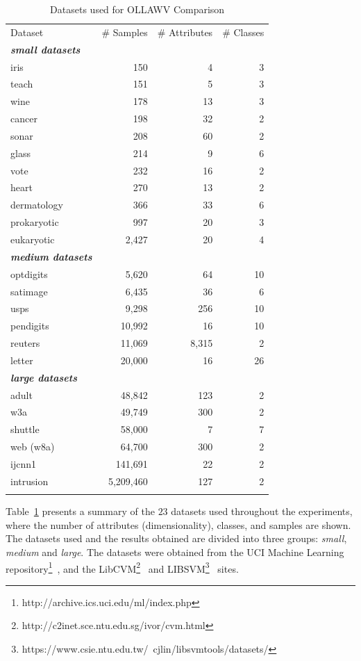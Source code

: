\documentclass[reqno]{vcuthesis}
\numberwithin{equation}{chapter}
\begin{document}
\begin{table}[t!]
\caption{Datasets used for OLLAWV Comparison}
\small
\centering
\label{tab:DatasetOLLAWV}
\begin{tabularx}{0.7\textwidth}{l@{\extracolsep{\fill}}rrr}
\hline\noalign{\smallskip}
Dataset & \# Samples & \# Attributes & \# Classes \\
\noalign{\smallskip}\hline\noalign{\smallskip}
\textbf{\textit{small datasets}} & \\
iris & 150 & 4 &  3  \\ 
teach & 151 & 5 &  3  \\ 
wine & 178 & 13 &  3  \\ 
cancer & 198 & 32 &  2  \\ 
sonar & 208 & 60 &  2  \\ 
glass & 214 & 9 &  6  \\ 
vote & 232 & 16 &  2  \\ 
heart & 270 & 13 &  2  \\ 
dermatology & 366 & 33 &  6  \\ 
prokaryotic & 997 & 20 &  3  \\ 
eukaryotic & 2,427 & 20 &  4  \\ 
\textbf{\textit{medium datasets}} & \\
optdigits & 5,620 & 64 &  10  \\ 
satimage & 6,435 & 36 &  6  \\ 
usps & 9,298 & 256 &  10  \\ 
pendigits & 10,992 & 16 &  10  \\ 
reuters & 11,069 & 8,315 &  2  \\ 
letter & 20,000 & 16 &  26  \\ 
\textbf{\textit{large datasets}} & \\
adult & 48,842 & 123 &  2  \\ 
w3a & 49,749 & 300 &  2  \\ 
shuttle & 58,000 & 7 &  7  \\ 
web (w8a) & 64,700 & 300 &  2  \\ 
ijcnn1 & 141,691 & 22 &  2  \\ 
intrusion & 5,209,460 & 127 &  2  \\  
\noalign{\smallskip}\hline
\end{tabularx}
\end{table}

Table~\ref{tab:DatasetOLLAWV} presents a summary of the $23$ datasets used throughout the experiments, where the number of attributes (dimensionality), classes, and samples are shown. The datasets used and the results obtained are divided into three groups: \textit{small}, \textit{medium} and \textit{large}. The datasets were obtained from the UCI Machine Learning repository\footnote{http://archive.ics.uci.edu/ml/index.php}~\cite{Lichman:2013}, and the LibCVM\footnote{http://c2inet.sce.ntu.edu.sg/ivor/cvm.html}~\cite{tsang2005core} and LIBSVM\footnote{https://www.csie.ntu.edu.tw/~cjlin/libsvmtools/datasets/}~\cite{CC01a} sites. 
\end{document}
